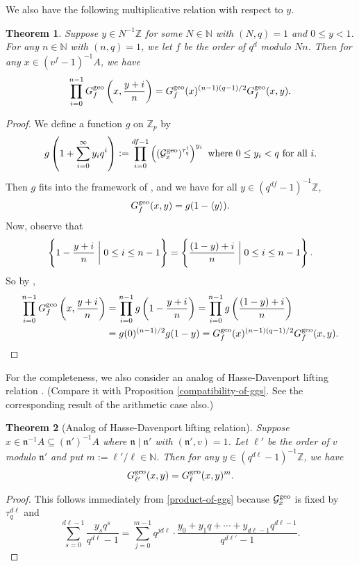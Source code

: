 \documentclass[11pt]{amsart}
\theoremstyle{plain}
\newtheorem{thm}{Theorem}[subsection]
\theoremstyle{definition}
\theoremstyle{remark}
\numberwithin{equation}{section}
\newcommand{\ZZ}{\mathbb{Z}}
\newcommand{\NN}{\mathbb{N}}
\newcommand{\nfk}{\mathfrak{n}}
\newcommand{\Gcal}{\mathcal{G}}
\newcommand{\sbe}{\subseteq}
\newcommand{\ang}[1]{\langle #1 \rangle}
\newcommand{\bggs}{\Gcal^{\textnormal{geo}}}
\newcommand{\ggs}{G_\l^{\textnormal{geo}}}
\newcommand{\ggsf}{G_f^{\textnormal{geo}}}
\let\l\ell
\begin{document}
	We also have the following multiplicative relation with respect to $y$.
	
	\begin{thm}
		Suppose $y \in N^{-1}\ZZ$ for some $N \in \NN$ with $(N,q) = 1$ and $0 \leq y < 1$.
		For any $n\in\NN$ with $(n,q) = 1$, we let $f$ be the order of $q^d$ modulo $Nn$.
		Then for any $x \in (v^f-1)^{-1}A$, we have
		$$
		\prod_{i=0}^{n-1} \ggsf\left(x,\frac{y+i}{n}\right)
		= \ggsf(x)^{(n-1)(q-1)/2} \ggsf(x,y).
		$$
	\end{thm}
	
	\begin{proof}
		We define a function $g$ on $\ZZ_p$ by
		$$
		g\left(1 + \sum_{i=0}^\infty y_iq^i\right) := \prod_{i=0}^{df-1} \left( (\bggs_x)^{\tau_q^i} \right)^{y_i}
		\text{ where }
		0 \leq y_i < q
		\text{ for all }
		i.
		$$
		Then $g$ fits into the framework of \cite[Section 2]{thakur1991gamma}, and we have for all $y \in (q^{df}-1)^{-1}\ZZ$,
		$$
		\ggsf(x,y) = g(1 - \ang{y}).
		$$
		Now, observe that
		$$
		\left\{ 1 - \frac{y+i}{n} \biggm| 0\leq i \leq n-1 \right\}
		= \left\{ \frac{(1-y)+i}{n} \biggm| 0\leq i \leq n-1 \right\}.
		$$
		So by \cite[Lemma 2.4]{thakur1991gamma},
		\begin{align*}
			\prod_{i=0}^{n-1} \ggsf\left(x,\frac{y+i}{n}\right)
			&= \prod_{i=0}^{n-1} g\left(1-\frac{y+i}{n}\right)
			= \prod_{i=0}^{n-1} g\left(\frac{(1-y)+i}{n}\right)   \\
			&= g(0)^{(n-1)/2} g(1-y)
			= \ggsf(x)^{(n-1)(q-1)/2} \ggsf(x,y).
		\end{align*}
	\end{proof}
	
	For the completeness, we also consider an analog of Hasse-Davenport lifting relation \cite{hd1935dienullstellen}.
	(Compare it with Proposition \ref{compatibility-of-ggs}.
	See the corresponding result of the arithmetic case \cite[Theorem VIII]{thakur1988gauss} also.)
	
	\begin{thm}[Analog of Hasse-Davenport lifting relation]
		Suppose $x \in \nfk^{-1}A \sbe (\nfk')^{-1}A$ where $\nfk \mid \nfk'$ with $(\nfk',v) = 1$.
		Let $\l'$ be the order of $v$ modulo $\nfk'$ and put $m := \l' / \l \in \NN$.
		Then for any $y \in (q^{d\l}-1)^{-1}\ZZ$, we have
		$$
		G_{\l'}^{\textnormal{geo}}(x,y) = \ggs(x,y)^m.
		$$
	\end{thm}
	
	\begin{proof}
		This follows immediately from \eqref{product-of-ggs} because $\bggs_x$ is fixed by $\tau_q^{d\l}$ and
		$$
		\sum_{s=0}^{d\l-1} \frac{y_sq^s}{q^{d\l}-1}
		= \sum_{j=0}^{m-1} q^{jd\l} \cdot \frac{y_0 + y_1 q+ \cdots + y_{d\l-1} q^{d\l-1}}{q^{d\l'}-1}.
		$$
	\end{proof}
	
\end{document}
